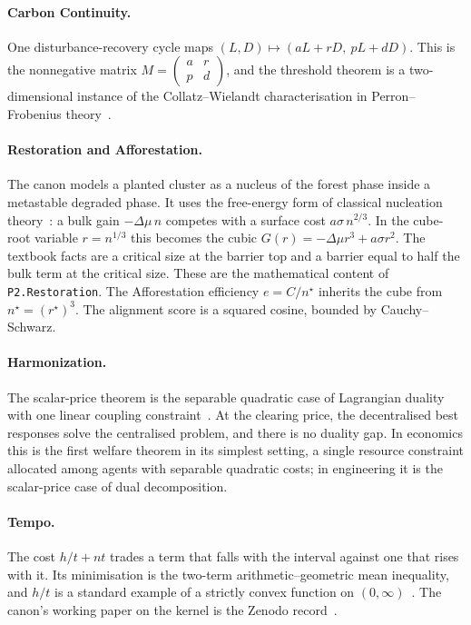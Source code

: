 \documentclass[11pt]{article}
\theoremstyle{definition}
\theoremstyle{remark}
\begin{document}
\paragraph{Carbon Continuity.} One disturbance-recovery cycle maps $(L,D)\mapsto(aL+rD,\ pL+dD)$.
This is the nonnegative matrix $M=\begin{pmatrix}a&r\\p&d\end{pmatrix}$, and the threshold theorem is a
two-dimensional instance of the Collatz--Wielandt characterisation in Perron--Frobenius theory~\cite{BermanPlemmons1994}.

\paragraph{Restoration and Afforestation.} The canon models a planted cluster as a nucleus of the forest phase inside a
metastable degraded phase. It uses the free-energy form of classical nucleation theory~\cite{Kashchiev2000}:
a bulk gain $-\Delta\mu\, n$ competes with a surface cost $a\sigma\, n^{2/3}$.
In the cube-root variable $r=n^{1/3}$ this becomes the cubic $G(r)=-\Delta\mu r^3+a\sigma r^2$.
The textbook facts are a critical size at the barrier top and a barrier equal to half the bulk term at the critical size.
These are the mathematical content of \texttt{P2.Restoration}.
The Afforestation efficiency $e=C/n^\star$ inherits the cube from $n^\star=(r^\star)^3$.
The alignment score is a squared cosine, bounded by Cauchy--Schwarz.

\paragraph{Harmonization.} The scalar-price theorem is the separable quadratic case of Lagrangian duality with
one linear coupling constraint~\cite{BoydVandenberghe2004}.
At the clearing price, the decentralised best responses solve the centralised problem, and there is no duality gap.
In economics this is the first welfare theorem in its simplest setting, a single resource constraint allocated among
agents with separable quadratic costs; in engineering it is the scalar-price case of dual decomposition.

\paragraph{Tempo.} The cost $h/t+nt$ trades a term that falls with the interval against one that rises with it.
Its minimisation is the two-term arithmetic--geometric mean inequality, and $h/t$ is a standard example of a strictly convex
function on $(0,\infty)$~\cite{BoydVandenberghe2004}.
The canon's working paper on the kernel is the Zenodo record~\cite{HartTempo2026}.
\end{document}
